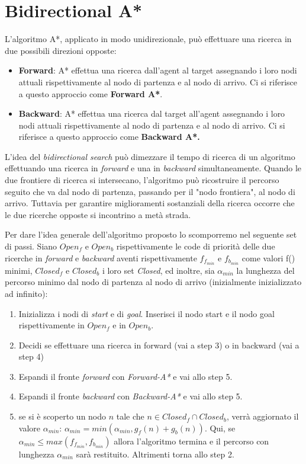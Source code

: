 \documentclass[12pt]{book}
\begin{document}
\section{Bidirectional A*}
\label{sec:bidirectional}
\par{L'algoritmo A*, applicato in modo unidirezionale, pu\`o effettuare una ricerca in due possibili direzioni opposte:
\begin{itemize}
\item \textbf{Forward}: A* effettua una ricerca dall'agent al target assegnando i loro nodi attuali rispettivamente al nodo di partenza e al nodo di arrivo. Ci si riferisce a questo approccio come \textbf{Forward A*}.
\item \textbf{Backward}: A* effettua una ricerca dal target all'agent assegnando i loro nodi attuali rispettivamente al nodo di partenza e al nodo di arrivo. Ci si riferisce a questo approccio come \textbf{Backward A*.}
\end{itemize}}
\par{
L'idea del \emph{bidirectional search} pu\`o dimezzare il tempo di ricerca di un algoritmo effettuando una ricerca in \emph{forward} e una in \emph{backward} simultaneamente. Quando le due frontiere di ricerca si intersecano, l'algoritmo pu\`o ricostruire il percorso seguito che va dal nodo di partenza, passando per il "nodo frontiera", al nodo di arrivo. Tuttavia per garantire miglioramenti sostanziali della ricerca occorre che le due ricerche opposte si incontrino a met\`a strada.}
\par{Per dare l'idea generale dell'algoritmo proposto lo scomporremo nel seguente set di passi. Siano \emph{$Open_{f}$} e \emph{$Open_{b}$} rispettivamente le code di priorit\`a delle due ricerche in \emph{forward} e \emph{backward} aventi rispettivamente $f_{f_{min}}$ e $f_{b_{min}}$ come valori f() minimi, \emph{$Closed_f$} e \emph{$Closed_b$} i loro set \emph{Closed}, ed inoltre, sia $\alpha_{min}$ la lunghezza del percorso minimo dal nodo di partenza al nodo di arrivo (inizialmente inizializzato ad infinito):

\begin{enumerate}
\item Inizializza i nodi di \emph{start} e di \emph{goal}. Inserisci il nodo start e il nodo goal rispettivamente in \emph{$Open_f$} e in \emph{$Open_b$}.
\item Decidi se effettuare una ricerca in forward (vai a step 3) o in backward (vai a step 4)
\item Espandi il fronte \emph{forward} con \emph{Forward-A*} e vai allo step 5.
\item Espandi il fronte \emph{backward} con \emph{Backward-A*} e vai allo step 5.
\item se si \`e scoperto un nodo $n$ tale che $n \in Closed_f \cap Closed_b$, verr\`a aggiornato il valore $\alpha_{min}$:  $\alpha_{min} = min(\alpha_{min}, g_{f}(n) + g_{b}(n))$. Qui, se $\alpha_{min} \leq max(f_{f_{min}}, f_{b_{min}})$ allora l'algoritmo termina e il percorso con lunghezza $\alpha_{min}$ sar\`a restituito. 
Altrimenti torna allo step 2.
\end{enumerate}

}
\end{document}
